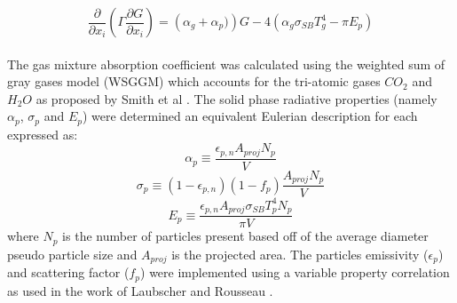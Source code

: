 \documentclass{webofc}
\begin{document}
\begin{equation}
\frac{\partial}{\partial x_{i}}\left(\Gamma\frac{\partial G}{\partial x_{i}}\right)=\left(\alpha_g+\alpha_p)\right)G-4\left(\alpha_g \sigma_{SB} T_{g}^4-\pi E_p \right)
\end{equation}
\\
The gas mixture absorption coefficient was calculated using the weighted sum of gray gases model (WSGGM) which accounts for the tri-atomic gases $CO_2$ and $H_2O$ as proposed by Smith et al \cite{smith}. The solid phase radiative properties (namely $\alpha_p$, $\sigma_p$ and $E_p$) were determined an equivalent Eulerian description for each expressed as:\\
\begin{equation}
\alpha_p \equiv \frac{\epsilon_{p,n}A_{proj}N_p}{V}
\end{equation}
\begin{equation}
\sigma_p \equiv (1-\epsilon_{p,n})(1-f_p)\frac{A_{proj} N_p}{V}
\end{equation} 
\begin{equation}
E_p \equiv \frac{\epsilon_{p,n}A_{proj}\sigma_{SB} T_{p}^4 N_p}{\pi V}
\end{equation}
where $N_p$ is the number of particles present based off of the average diameter pseudo particle size and $A_{proj}$ is the projected area. The particles emissivity ($\epsilon_p$) and scattering factor ($f_p$) were implemented using a variable property correlation as used in the work of Laubscher and Rousseau \cite{laubscher_3}.

\newpage
\end{document}
